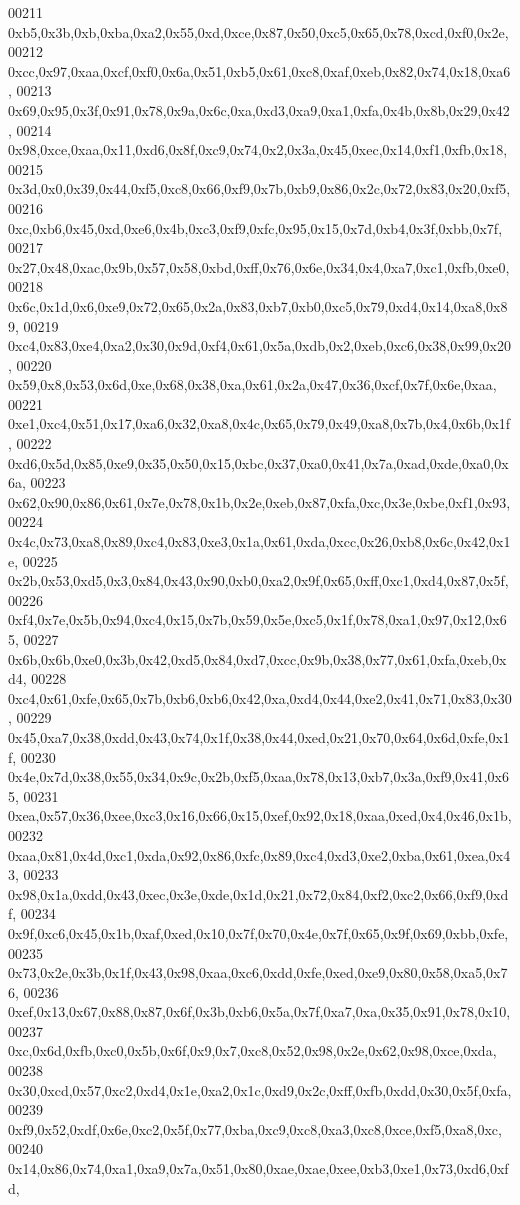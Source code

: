 \begin{DoxyCode}
00211   0xb5,0x3b,0xb,0xba,0xa2,0x55,0xd,0xce,0x87,0x50,0xc5,0x65,0x78,0xcd,0xf0,0x2e,
00212   0xcc,0x97,0xaa,0xcf,0xf0,0x6a,0x51,0xb5,0x61,0xc8,0xaf,0xeb,0x82,0x74,0x18,0xa6,
00213   0x69,0x95,0x3f,0x91,0x78,0x9a,0x6c,0xa,0xd3,0xa9,0xa1,0xfa,0x4b,0x8b,0x29,0x42,
00214   0x98,0xce,0xaa,0x11,0xd6,0x8f,0xc9,0x74,0x2,0x3a,0x45,0xec,0x14,0xf1,0xfb,0x18,
00215   0x3d,0x0,0x39,0x44,0xf5,0xc8,0x66,0xf9,0x7b,0xb9,0x86,0x2c,0x72,0x83,0x20,0xf5,
00216   0xc,0xb6,0x45,0xd,0xe6,0x4b,0xc3,0xf9,0xfc,0x95,0x15,0x7d,0xb4,0x3f,0xbb,0x7f,
00217   0x27,0x48,0xac,0x9b,0x57,0x58,0xbd,0xff,0x76,0x6e,0x34,0x4,0xa7,0xc1,0xfb,0xe0,
00218   0x6c,0x1d,0x6,0xe9,0x72,0x65,0x2a,0x83,0xb7,0xb0,0xc5,0x79,0xd4,0x14,0xa8,0x89,
00219   0xc4,0x83,0xe4,0xa2,0x30,0x9d,0xf4,0x61,0x5a,0xdb,0x2,0xeb,0xc6,0x38,0x99,0x20,
00220   0x59,0x8,0x53,0x6d,0xe,0x68,0x38,0xa,0x61,0x2a,0x47,0x36,0xcf,0x7f,0x6e,0xaa,
00221   0xe1,0xc4,0x51,0x17,0xa6,0x32,0xa8,0x4c,0x65,0x79,0x49,0xa8,0x7b,0x4,0x6b,0x1f,
00222   0xd6,0x5d,0x85,0xe9,0x35,0x50,0x15,0xbc,0x37,0xa0,0x41,0x7a,0xad,0xde,0xa0,0x6a,
00223   0x62,0x90,0x86,0x61,0x7e,0x78,0x1b,0x2e,0xeb,0x87,0xfa,0xc,0x3e,0xbe,0xf1,0x93,
00224   0x4c,0x73,0xa8,0x89,0xc4,0x83,0xe3,0x1a,0x61,0xda,0xcc,0x26,0xb8,0x6c,0x42,0x1e,
00225   0x2b,0x53,0xd5,0x3,0x84,0x43,0x90,0xb0,0xa2,0x9f,0x65,0xff,0xc1,0xd4,0x87,0x5f,
00226   0xf4,0x7e,0x5b,0x94,0xc4,0x15,0x7b,0x59,0x5e,0xc5,0x1f,0x78,0xa1,0x97,0x12,0x65,
00227   0x6b,0x6b,0xe0,0x3b,0x42,0xd5,0x84,0xd7,0xcc,0x9b,0x38,0x77,0x61,0xfa,0xeb,0xd4,
00228   0xc4,0x61,0xfe,0x65,0x7b,0xb6,0xb6,0x42,0xa,0xd4,0x44,0xe2,0x41,0x71,0x83,0x30,
00229   0x45,0xa7,0x38,0xdd,0x43,0x74,0x1f,0x38,0x44,0xed,0x21,0x70,0x64,0x6d,0xfe,0x1f,
00230   0x4e,0x7d,0x38,0x55,0x34,0x9c,0x2b,0xf5,0xaa,0x78,0x13,0xb7,0x3a,0xf9,0x41,0x65,
00231   0xea,0x57,0x36,0xee,0xc3,0x16,0x66,0x15,0xef,0x92,0x18,0xaa,0xed,0x4,0x46,0x1b,
00232   0xaa,0x81,0x4d,0xc1,0xda,0x92,0x86,0xfc,0x89,0xc4,0xd3,0xe2,0xba,0x61,0xea,0x43,
00233   0x98,0x1a,0xdd,0x43,0xec,0x3e,0xde,0x1d,0x21,0x72,0x84,0xf2,0xc2,0x66,0xf9,0xdf,
00234   0x9f,0xc6,0x45,0x1b,0xaf,0xed,0x10,0x7f,0x70,0x4e,0x7f,0x65,0x9f,0x69,0xbb,0xfe,
00235   0x73,0x2e,0x3b,0x1f,0x43,0x98,0xaa,0xc6,0xdd,0xfe,0xed,0xe9,0x80,0x58,0xa5,0x76,
00236   0xef,0x13,0x67,0x88,0x87,0x6f,0x3b,0xb6,0x5a,0x7f,0xa7,0xa,0x35,0x91,0x78,0x10,
00237   0xc,0x6d,0xfb,0xc0,0x5b,0x6f,0x9,0x7,0xc8,0x52,0x98,0x2e,0x62,0x98,0xce,0xda,
00238   0x30,0xcd,0x57,0xc2,0xd4,0x1e,0xa2,0x1c,0xd9,0x2c,0xff,0xfb,0xdd,0x30,0x5f,0xfa,
00239   0xf9,0x52,0xdf,0x6e,0xc2,0x5f,0x77,0xba,0xc9,0xc8,0xa3,0xc8,0xce,0xf5,0xa8,0xc,
00240   0x14,0x86,0x74,0xa1,0xa9,0x7a,0x51,0x80,0xae,0xae,0xee,0xb3,0xe1,0x73,0xd6,0xfd,

\end{DoxyCode}
